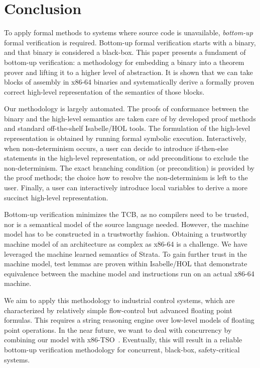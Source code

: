 \section{Conclusion}

To apply formal methods to systems where source code is unavailable, \emph{bottom-up} formal verification is required.
Bottom-up formal verification starts with a binary, and that binary is considered a black-box.
This paper presents a fundament of bottom-up verification: a methodology for embedding a binary into a theorem prover and lifting it to a higher level of abstraction.
It is shown that we can take blocks of assembly in x86-64 binaries and systematically derive a formally proven correct high-level representation of the semantics of those blocks.

Our methodology is largely automated.
The proofs of conformance between the binary and the high-level semantics are taken care of by developed proof methods and standard off-the-shelf Isabelle/HOL tools.
The formulation of the high-level representation is obtained by running formal symbolic execution.
Interactively, when non-determinism occurs, a user can decide to introduce if-then-else statements in the high-level representation, or add preconditions to exclude the non-determinism.
The exact branching condition (or precondition) is provided by the proof methods; the choice how to resolve the non-determinism is left to the user.
Finally, a user can interactively introduce local variables to derive a more succinct high-level representation.

Bottom-up verification minimizes the TCB, as no compilers need to be trusted, nor is a semantical model of the source language needed.
However, the machine model has to be constructed in a trustworthy fashion.
Obtaining a trustworthy machine model of an architecture as complex as x86-64 is a challenge.
We have leveraged the machine learned semantics of Strata.
To gain further trust in the machine model, test lemmas are proven within Isabelle/HOL that demonstrate equivalence between the machine model and instructions run on an actual x86-64 machine.

We aim to apply this methodology to industrial control systems, which are characterized by relatively simple flow-control but advanced floating point formulas.
This requires a string reasoning engine over low-level models of floating point operations.
In the near future, we want to deal with concurrency by combining our model with x86-TSO~\cite{sewell2010x86,vsevvcik2013compcerttso}.
Eventually, this will result in a reliable bottom-up verification methodology for concurrent, black-box, safety-critical systems.




